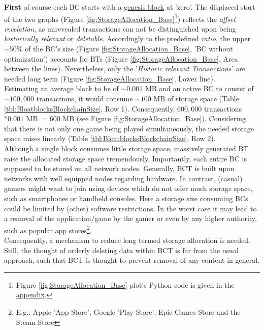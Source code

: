 \noindent \textbf{First} of course each \gls{BC} starts with a \hyperref[def_GenesisBlock]{genesis block} at 'zero'.
The displaced start of the two graphs
(Figure \ref{fig:StorageAllocation_Base}\footnote{\hspace{0.1cm}Figure \ref{fig:StorageAllocation_Base} plot's Python code is given in the \hyperref[script:GeneralStorageAllocation]{appendix}.}) reflects the \textit{offset revelation},
as unrevealed transactions can not be distinguished upon being \textit{historically relevant} or \textit{deletable}.
Accordingly to the predefined \textit{ratio}, the upper $\sim50$\% of the \gls{BC}'s size (Figure \ref{fig:StorageAllocation_Base}, '\gls{BC} without optimization')
accounts for \gls{BT}s (Figure \ref{fig:StorageAllocation_Base}, Area between the lines).
Nevertheless, only the '\textit{Historic relevant Transactions}' are needed long term (Figure \ref{fig:StorageAllocation_Base}, Lower line). \\
Estimating an average block to be of $\sim0.001$ MB and an active \gls{BC} to consist of $\sim100,000$ transactions,
it would consume $\sim100$ MB of storage space (Table \ref{tbl:BloatblocksBlockchainSize}, Row 1).
Consequently, $600,000$ transactions $* 0.001$ MB $= 600$ MB (see Figure \ref{fig:StorageAllocation_Base}).
Considering that there is not only one game being played simultaneously, the needed storage space raises linearly (Table \ref{tbl:BloatblocksBlockchainSize}, Row 2). \\
Although a single block consumes little storage space, massively generated \gls{BT} raise the allocated storage space tremendously.
Importantly, each entire \gls{BC} is supposed to be stored on all network nodes.
Generally, \gls{BCT} is built upon networks with well equipped nodes regarding hardware.
In contrast, (casual) gamers might want to join using devices which do not offer much storage space, such as smartphones or handheld consoles.
Here a storage size consuming \gls{BC}s could be limited by (other) software restrictions.
In the worst case it may lead to a removal of the application/game by the gamer or even by any higher authority,
such as popular app stores\footnote{\hspace{0.1cm}E.g.: Apple 'App Store', Google 'Play Store', Epic Games Store and the Steam Store}. \\
Consequently, a mechanism to reduce long termed storage allocation is needed.
Still, the thought of orderly deleting data within \gls{BCT} is far from the usual approach,
such that \gls{BCT} is thought to prevent removal of any content in general.
